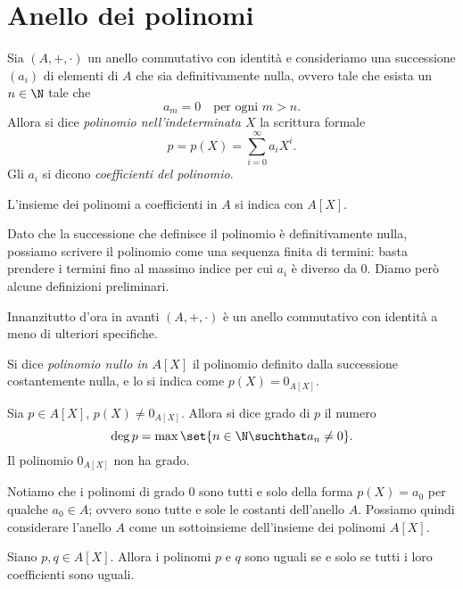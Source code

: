 \section{Anello dei polinomi}

\begin{definition}
    Sia $(A, +, \cdot)$ un anello commutativo con identità e consideriamo una successione $\left(a_i\right)$ di elementi di $A$ che sia definitivamente nulla, ovvero tale che esista un $n \in \N$ tale che \[
        a_m = 0 \quad \text{per ogni } m > n.    
    \]
    Allora si dice \emph{polinomio nell'indeterminata $X$} la scrittura formale \[
        p = p(X) = \sum_{i = 0}^{\infty} a_iX^i.    
    \] Gli $a_i$ si dicono \emph{coefficienti del polinomio}.

    L'insieme dei polinomi a coefficienti in $A$ si indica con $A[X]$.
\end{definition}

Dato che la successione che definisce il polinomio è definitivamente nulla, possiamo scrivere il polinomio come una sequenza finita di termini: basta prendere i termini fino al massimo indice per cui $a_i$ è diverso da $0$. Diamo però alcune definizioni preliminari.

Innanzitutto d'ora in avanti $(A, +, \cdot)$ è un anello commutativo con identità a meno di ulteriori specifiche.

\begin{definition}
    Si dice \emph{polinomio nullo in $A[X]$} il polinomio definito dalla successione costantemente nulla, e lo si indica come $p(X) = 0_{A[X]}$.
\end{definition}

\begin{definition}
    Sia $p \in A[X]$, $p(X) \neq 0_{A[X]}$. Allora si dice grado di $p$ il numero \[
        \deg p = \max \set{n \in \N \suchthat a_n \neq 0}.    
    \] Il polinomio $0_{A[X]}$ non ha grado.
\end{definition}

Notiamo che i polinomi di grado $0$ sono tutti e solo della forma $p(X) = a_0$ per qualche $a_0 \in A$; ovvero sono tutte e sole le costanti dell'anello $A$. Possiamo quindi considerare l'anello $A$ come un sottoinsieme dell'insieme dei polinomi $A[X]$.

\begin{definition}
    Siano $p, q \in A[X]$. Allora i polinomi $p$ e $q$ sono uguali se e solo se tutti i loro coefficienti sono uguali.
\end{definition}

